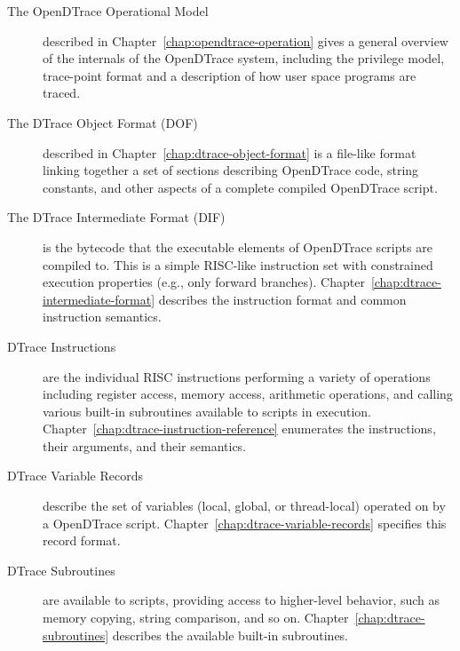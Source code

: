 \begin{description}

\item[The OpenDTrace Operational Model] described in
  Chapter~\ref{chap:opendtrace-operation} gives a general overview of
  the internals of the OpenDTrace system, including the privilege
  model, trace-point format and a description of how user space
  programs are traced.

\item[The DTrace Object Format (DOF)] described in
  Chapter~\ref{chap:dtrace-object-format} is a file-like format linking
  together a set of sections describing OpenDTrace code, string constants, and
  other aspects of a complete compiled OpenDTrace script.

\item[The DTrace Intermediate Format (DIF)] is the bytecode that the
  executable elements of OpenDTrace scripts are compiled to.
  This is a simple RISC-like instruction set with constrained execution
  properties (e.g., only forward branches).
  Chapter~\ref{chap:dtrace-intermediate-format} describes the instruction
  format and common instruction semantics.

\item[DTrace Instructions] are the individual RISC instructions performing
  a variety of operations including register access, memory access, arithmetic
  operations, and calling various built-in subroutines available to scripts in
  execution.
  Chapter~\ref{chap:dtrace-instruction-reference} enumerates the instructions,
  their arguments, and their semantics.

\item[DTrace Variable Records] describe the set of variables (local, global,
  or thread-local) operated on by a OpenDTrace script.
  Chapter~\ref{chap:dtrace-variable-records} specifies this record format.

\item[DTrace Subroutines] are available to scripts, providing access to
  higher-level behavior, such as memory copying, string comparison, and so on.
  Chapter~\ref{chap:dtrace-subroutines} describes the available built-in
  subroutines.

\end{description}
